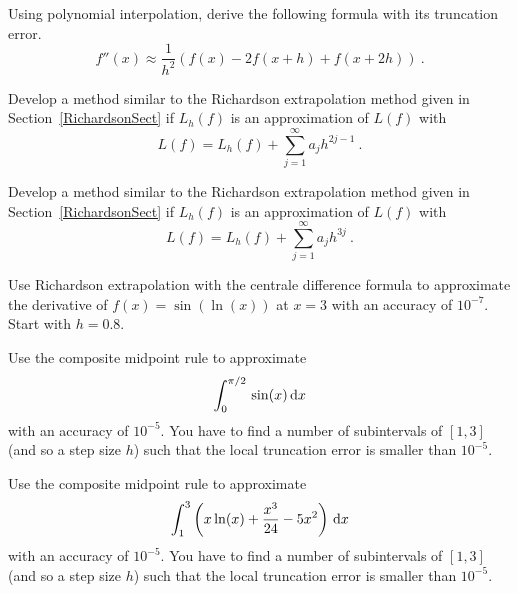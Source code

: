 \begin{question}
Using polynomial interpolation, derive the following formula with its
truncation error.
\begin{equation}\label{ddfapprox}
f''(x) \approx \frac{1}{h^2}\left(f(x)-2f(x+h)+f(x+2h)\right) \ .
\end{equation}
\label{diffQ2}
\end{question}

\begin{question}
Develop a method similar to the Richardson extrapolation method given
in Section~\ref{RichardsonSect} if $L_h(f)$ is an approximation of
$L(f)$ with
\begin{equation}\label{questB1}
L(f) = L_h(f) + \sum_{j=1}^\infty a_j h^{2j-1} \ .
\end{equation}
\label{diffQ3}
\end{question}

\begin{question}
Develop a method similar to the Richardson extrapolation method given
in Section~\ref{RichardsonSect} if $L_h(f)$ is an approximation of
$L(f)$ with
\begin{equation}\label{questC1}
L(f) = L_h(f) + \sum_{j=1}^\infty a_j h^{3j} \ .
\end{equation}
\label{diffQ4}
\end{question}

\begin{question}
Use Richardson extrapolation with the centrale difference formula to
approximate the derivative of $f(x)=\sin(\ln(x))$ at $x=3$ with an
accuracy of $10^{-7}$.  Start with $h=0.8$.
\label{diffQ5}
\end{question}

\begin{question}
Use the composite midpoint rule to approximate
\[
\int_0^{\pi/2}\,\sin(x)\,\mathrm{d}x
\]
with an accuracy of $10^{-5}$.  You have to find a number of
subintervals of $[1,3]$ (and so a step size $h$) such that the local
truncation error is smaller than $10^{-5}$.
\label{diffQ6}
\end{question}


\begin{question}
Use the composite midpoint rule to approximate
\[
\int_1^3 \left( x \ln(x) + \frac{x^3}{24} - 5x^2 \right) \,\mathrm{d}x
\]
with an accuracy of $10^{-5}$.  You have to find a number of
subintervals of $[1,3]$ (and so a step size $h$) such that the local
truncation error is smaller than $10^{-5}$.
\label{diffQ7}
\end{question}


